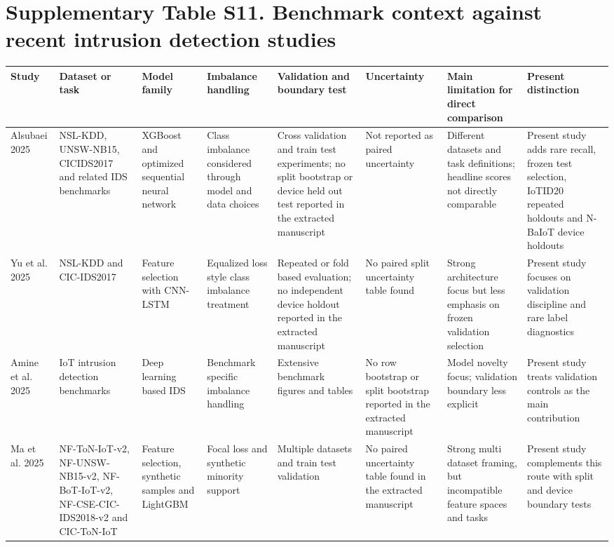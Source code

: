 \documentclass[10pt]{article}
\begin{document}
\section*{Supplementary Table S11. Benchmark context against recent intrusion detection studies}

\begin{center}
\tiny
\setlength{\tabcolsep}{2pt}
\begin{longtable}{p{1.4cm}p{2.0cm}p{2.0cm}p{1.9cm}p{2.5cm}p{1.6cm}p{2.1cm}p{2.6cm}}
\toprule
Study & Dataset or task & Model family & Imbalance handling & Validation and boundary test & Uncertainty & Main limitation for direct comparison & Present distinction \\
\midrule
\endhead
Alsubaei 2025 & NSL-KDD, UNSW-NB15, CICIDS2017 and related IDS benchmarks & XGBoost and optimized sequential neural network & Class imbalance considered through model and data choices & Cross validation and train test experiments; no split bootstrap or device held out test reported in the extracted manuscript & Not reported as paired uncertainty & Different datasets and task definitions; headline scores not directly comparable & Present study adds rare recall, frozen test selection, IoTID20 repeated holdouts and N-BaIoT device holdouts \\
Yu et al. 2025 & NSL-KDD and CIC-IDS2017 & Feature selection with CNN-LSTM & Equalized loss style class imbalance treatment & Repeated or fold based evaluation; no independent device holdout reported in the extracted manuscript & No paired split uncertainty table found & Strong architecture focus but less emphasis on frozen validation selection & Present study focuses on validation discipline and rare label diagnostics \\
Amine et al. 2025 & IoT intrusion detection benchmarks & Deep learning based IDS & Benchmark specific imbalance handling & Extensive benchmark figures and tables & No row bootstrap or split bootstrap reported in the extracted manuscript & Model novelty focus; validation boundary less explicit & Present study treats validation controls as the main contribution \\
Ma et al. 2025 & NF-ToN-IoT-v2, NF-UNSW-NB15-v2, NF-BoT-IoT-v2, NF-CSE-CIC-IDS2018-v2 and CIC-ToN-IoT & Feature selection, synthetic samples and LightGBM & Focal loss and synthetic minority support & Multiple datasets and train test validation & No paired uncertainty table found in the extracted manuscript & Strong multi dataset framing, but incompatible feature spaces and tasks & Present study complements this route with split and device boundary tests \\

\end{longtable}
\end{center}
\end{document}
